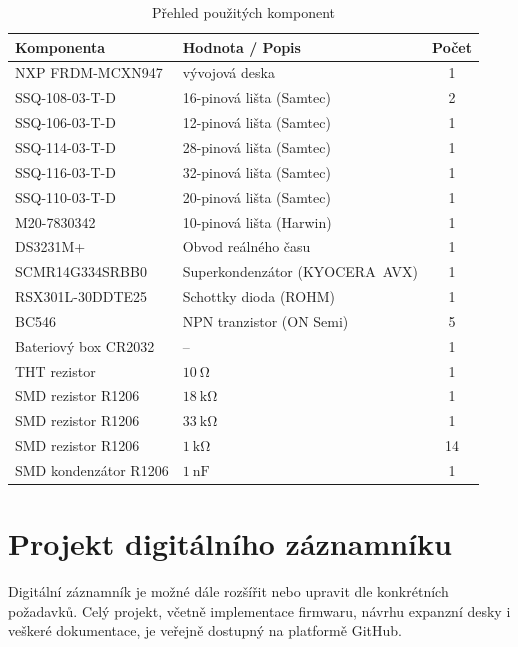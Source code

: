 \begin{table}[htbp]
    \centering
    \caption{Přehled použitých komponent}
    \label{tab:bom}
    \begin{tabularx}{\textwidth}{|X|X|c|}
        \hline
        \textbf{Komponenta} & \textbf{Hodnota / Popis} & \textbf{Počet} \\
        \hline
        NXP FRDM-MCXN947    & vývojová deska                 & 1  \\ \hline
        SSQ-108-03-T-D      & 16-pinová lišta (Samtec)       & 2  \\ \hline
        SSQ-106-03-T-D      & 12-pinová lišta (Samtec)       & 1  \\ \hline
        SSQ-114-03-T-D      & 28-pinová lišta (Samtec)       & 1  \\ \hline
        SSQ-116-03-T-D      & 32-pinová lišta (Samtec)       & 1  \\ \hline
        SSQ-110-03-T-D      & 20-pinová lišta (Samtec)       & 1  \\ \hline
        M20-7830342         & 10-pinová lišta (Harwin)       & 1  \\ \hline
        DS3231M+            & Obvod reálného času             & 1  \\ \hline
        SCMR14G334SRBB0     & Superkondenzátor (\mbox{KYOCERA AVX})  & 1  \\ \hline
        RSX301L-30DDTE25    & Schottky dioda (ROHM)           & 1  \\ \hline
        BC546               & NPN tranzistor (ON Semi)        & 5  \\ \hline
        Bateriový box CR2032 & --                             & 1  \\ \hline
        THT rezistor        & $\SI{10}{\ohm}$                 & 1  \\ \hline
        SMD rezistor R1206  & $\SI{18}{\kilo\ohm}$            & 1  \\ \hline
        SMD rezistor R1206  & $\SI{33}{\kilo\ohm}$            & 1  \\ \hline
        SMD rezistor R1206  & $\SI{1}{\kilo\ohm}$             & 14 \\ \hline
        SMD kondenzátor R1206  & $\SI{1}{\nano\farad}$        & 1  \\ \hline
    \end{tabularx}
\end{table}

\chapter{Projekt digitálního záznamníku}
Digitální záznamník je možné dále rozšířit nebo upravit dle konkrétních požadavků. Celý projekt, včetně implementace firmwaru, návrhu expanzní desky i veškeré dokumentace, je veřejně dostupný na platformě GitHub.

